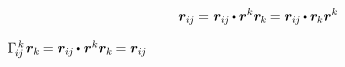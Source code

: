 \begin{otherlanguage}{russian}
\vspace{1.2em}\begin{equation*}
\bm{r}_{i\hspace{-0.1ex}j} \hspace{-0.1ex} = \hspace{.1ex}
\tikzmark{beginChristoffelSymbolOne} \bm{r}_{i\hspace{-0.1ex}j} \hspace{-0.15ex} \dotp \tikzmark{beginEtensorUpDown} \bm{r}^{k} \hspace{-0.4ex} \tikzmark{endChristoffelSymbolOne} \hspace{.4ex} \bm{r}_{\hspace{-0.1ex}k} \tikzmark{endEtensorUpDown} \hspace{-0.2ex}
= \tikzmark{beginChristoffelSymbolOther} \bm{r}_{i\hspace{-0.1ex}j} \hspace{-0.15ex} \dotp \tikzmark{beginEtensorDownUp} \bm{r}_{\hspace{-0.1ex}k} \tikzmark{endChristoffelSymbolOther} \bm{r}^k \tikzmark{endEtensorDownUp}
\end{equation*}%
%
%
%

${\Gamma_{\hspace{-0.25ex}i\hspace{-0.1ex}j}^{\hspace{.25ex}k} \hspace{.2ex} \bm{r}_k \hspace{-0.2ex} = \bm{r}_{i\hspace{-0.1ex}j} \hspace{-0.16ex} \dotp \hspace{.1ex} \bm{r}^k \bm{r}_k \hspace{-0.2ex} = \bm{r}_{i\hspace{-0.1ex}j}}$


\end{otherlanguage}
